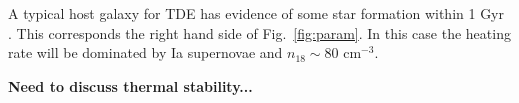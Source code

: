 \documentclass[usenatbib,fleqn]{mnras}
\newcommand{\Mbh}[1][]{M_{\bullet#1}}
\newcommand{\Msun}{{\rm M_\odot}}
\begin{document}
A typical host galaxy for TDE has evidence of some star formation
within 1 Gyr \citep{French+2016}. This corresponds the right hand side
of Fig.~\ref{fig:param}. In this case the heating rate will be
dominated by Ia supernovae and $n_{18}\sim 80$ cm$^{-3}$.

{\bf Need to discuss thermal stability...}






 
\end{document}
